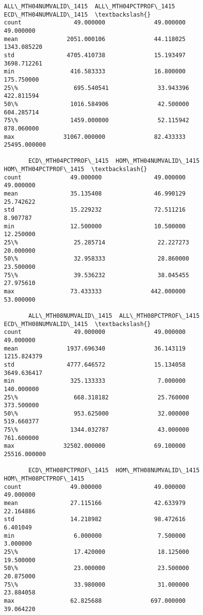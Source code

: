 \documentclass[11pt]{article}
\begin{document}
    \begin{Verbatim}[commandchars=\\\{\}]
       ALL\_MTH04NUMVALID\_1415  ALL\_MTH04PCTPROF\_1415  ECD\_MTH04NUMVALID\_1415  \textbackslash{}
count               49.000000              49.000000               49.000000   
mean              2051.000106              44.118025             1343.085220   
std               4705.410738              15.193497             3698.712261   
min                416.583333              16.800000              175.750000   
25\%                695.540541              33.943396              422.811594   
50\%               1016.584906              42.500000              604.285714   
75\%               1459.000000              52.115942              878.060000   
max              31067.000000              82.433333            25495.000000   

       ECD\_MTH04PCTPROF\_1415  HOM\_MTH04NUMVALID\_1415  HOM\_MTH04PCTPROF\_1415  \textbackslash{}
count              49.000000               49.000000              49.000000   
mean               35.135408               46.990129              25.742622   
std                15.229232               72.511216               8.907787   
min                12.500000               10.500000              12.250000   
25\%                25.285714               22.227273              20.000000   
50\%                32.958333               28.860000              23.500000   
75\%                39.536232               38.045455              27.975610   
max                73.433333              442.000000              53.000000   

       ALL\_MTH08NUMVALID\_1415  ALL\_MTH08PCTPROF\_1415  ECD\_MTH08NUMVALID\_1415  \textbackslash{}
count               49.000000              49.000000               49.000000   
mean              1937.696340              36.143119             1215.824379   
std               4777.646572              15.134058             3649.636417   
min                325.133333               7.000000              140.000000   
25\%                668.318182              25.760000              373.500000   
50\%                953.625000              32.000000              519.660377   
75\%               1344.032787              43.000000              761.600000   
max              32502.000000              69.100000            25516.000000   

       ECD\_MTH08PCTPROF\_1415  HOM\_MTH08NUMVALID\_1415  HOM\_MTH08PCTPROF\_1415  
count              49.000000               49.000000              49.000000  
mean               27.115166               42.633979              22.164886  
std                14.218982               98.472616               6.401049  
min                 6.000000                7.500000               3.000000  
25\%                17.420000               18.125000              19.500000  
50\%                23.000000               23.500000              20.875000  
75\%                33.980000               31.000000              23.884058  
max                62.825688              697.000000              39.064220   


    \end{Verbatim}
\end{document}
